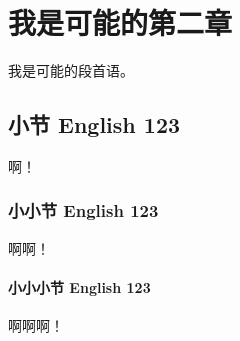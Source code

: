 \chapter{我是可能的第二章}
\label{chap:fundamental}

我是可能的段首语。

\section{小节 English 123}
\label{sec:funda:1}

啊！

\subsection{小小节 English 123}
\label{sec:funda:1:1}

啊啊！

\subsubsection{小小小节 English 123}
\label{sec:funda:1:1:1}

啊啊啊！